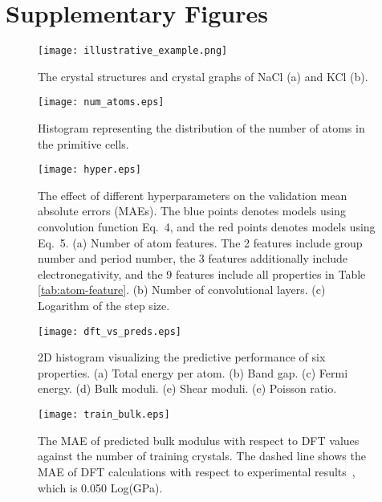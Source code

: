 \documentclass[twocolumn, prl]{revtex4-1}
\begin{document}
\clearpage
\section{Supplementary Figures}


\begin{figure}[htb]
    \centering
    \texttt{[image: illustrative\_example.png]}
    \caption{The crystal structures and crystal graphs of NaCl (a) and KCl (b). }
    \label{fig:nacl-kcl}
\end{figure}


\begin{figure}[htb]
    \centering
    \texttt{[image: num\_atoms.eps]}
    \caption{Histogram representing the distribution of the number of atoms in the primitive cells. }
    \label{fig:matproj}
\end{figure}



\begin{figure}[htb]
    \centering
    \texttt{[image: hyper.eps]}
    \caption{The effect of different hyperparameters on the validation mean absolute errors (MAEs). The blue points denotes models using convolution function Eq.~4, and the red points denotes models using Eq.~5. (a) Number of atom features. The 2 features include group number and period number, the 3 features additionally include electronegativity, and the 9 features include all properties in Table \ref{tab:atom-feature}. (b) Number of convolutional layers. (c) Logarithm of the step size. }
    \label{fig:hyper}
\end{figure}



\begin{figure}[htb]
    \centering
    \texttt{[image: dft\_vs\_preds.eps]}
    \caption{2D histogram visualizing the predictive performance of six properties. (a) Total energy per atom. (b) Band gap. (c) Fermi energy. (d) Bulk moduli. (e) Shear moduli. (e) Poisson ratio. }
    \label{fig:other-properties}
\end{figure}



\begin{figure}[htb]
    \centering
    \texttt{[image: train\_bulk.eps]}
    \caption{The MAE of predicted bulk modulus with respect to DFT values against the number of training crystals. The dashed line shows the MAE of DFT calculations with respect to experimental results~\cite{de2015charting}, which is 0.050 Log(GPa). }
    \label{fig:bulk-size-trend}
\end{figure}
\end{document}
